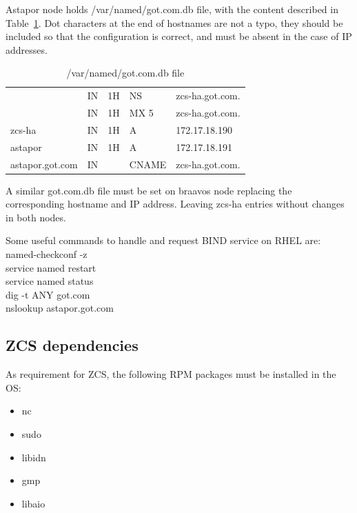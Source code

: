 \documentclass[a4paper, 12pt]{book}
\begin{document}
\noindent Astapor node holds /var/named/got.com.db file, with the content described in Table~\ref{table:bindastapor}. Dot characters at the end of hostnames are not a typo, they should be included so that the configuration is correct, and must be absent in the case of IP addresses.

\FloatBarrier
\begin{table}[H]
  \centering
  \begin{tabular}{ | l l l l l | }
    \hline
	                  & IN & 1H & NS    & zcs-ha.got.com.\\
                      & IN & 1H & MX 5  & zcs-ha.got.com.\\
      zcs-ha          & IN & 1H & A     & 172.17.18.190\\
      astapor         & IN & 1H & A     & 172.17.18.191\\
      astapor.got.com & IN &    & CNAME & zcs-ha.got.com.\\
    \hline
  \end{tabular}
\caption{/var/named/got.com.db file}
\label{table:bindastapor}
\end{table}

\noindent A similar got.com.db file must be set on braavos node replacing the corresponding hostname and IP address. Leaving zcs-ha entries without changes in both nodes.\bigskip

\noindent Some useful commands to handle and request BIND service on RHEL are:\\
\indent named-checkconf -z \\
\indent service named restart \\
\indent service named status \\
\indent dig -t ANY got.com \\
\indent nslookup astapor.got.com

\subsection{ZCS dependencies}
\label{sec:zcsdeps}

As requirement for ZCS, the following RPM packages must be installed in the OS:

\begin{itemize}
	\item nc
	\item sudo
	\item libidn 
	\item gmp 
	\item libaio 
\end{itemize}
\end{document}

